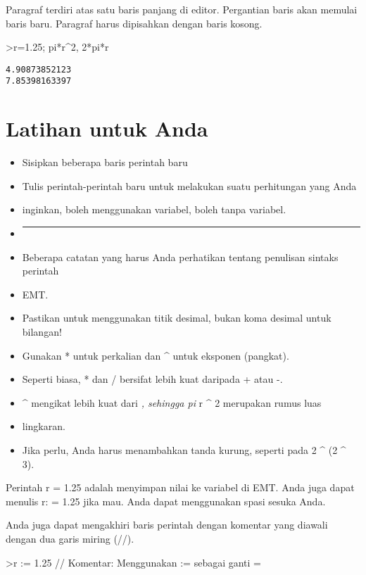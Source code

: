 \documentclass[
]{book}
\begin{document}
Paragraf terdiri atas satu baris panjang di editor. Pergantian baris akan memulai baris baru. Paragraf harus dipisahkan dengan baris kosong.

\textgreater r=1.25; pi*r\^{}2, 2*pi*r

\begin{verbatim}
4.90873852123
7.85398163397
\end{verbatim}

\section{Latihan untuk Anda}\label{latihan-untuk-anda}

\begin{itemize}
\item
  Sisipkan beberapa baris perintah baru
\item
  Tulis perintah-perintah baru untuk melakukan suatu perhitungan yang Anda
\item
  inginkan, boleh menggunakan variabel, boleh tanpa variabel.
\item
  \begin{center}\rule{0.5\linewidth}{0.5pt}\end{center}
\item
  Beberapa catatan yang harus Anda perhatikan tentang penulisan sintaks perintah
\item
  EMT.
\item
  Pastikan untuk menggunakan titik desimal, bukan koma desimal untuk bilangan!
\item
  Gunakan * untuk perkalian dan \^{} untuk eksponen (pangkat).
\item
  Seperti biasa, * dan / bersifat lebih kuat daripada + atau -.
\item
  \^{} mengikat lebih kuat dari \emph{, sehingga pi } r \^{} 2 merupakan rumus luas
\item
  lingkaran.
\item
  Jika perlu, Anda harus menambahkan tanda kurung, seperti pada 2 \^{} (2 \^{} 3).
\end{itemize}

Perintah r = 1.25 adalah menyimpan nilai ke variabel di EMT. Anda juga dapat menulis r: = 1.25 jika mau. Anda dapat menggunakan spasi sesuka Anda.

Anda juga dapat mengakhiri baris perintah dengan komentar yang diawali dengan dua garis miring (//).

\textgreater r := 1.25 // Komentar: Menggunakan := sebagai ganti =
\end{document}
